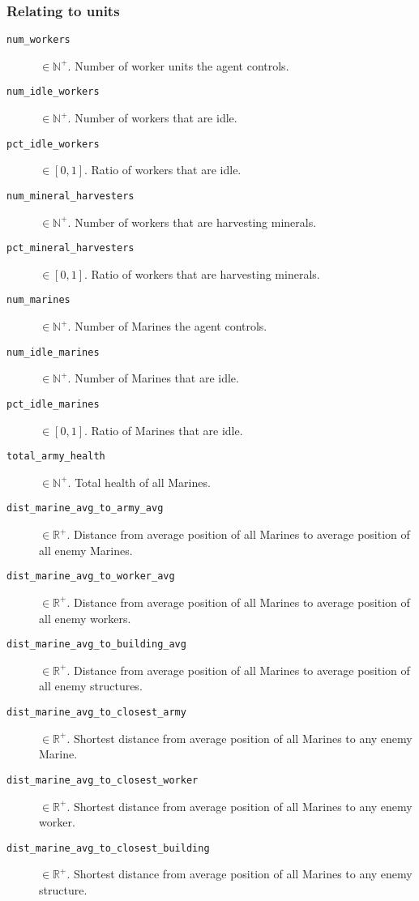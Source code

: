 \subsubsection*{Relating to units}
\begin{description}
    \item[\texttt{num\_workers}] $\in \mathbb{N}^+$. Number of worker units the agent controls.
    \item[\texttt{num\_idle\_workers}] $\in \mathbb{N}^+$. Number of workers that are idle.
    \item[\texttt{pct\_idle\_workers}] $\in [0,1]$. Ratio of workers that are idle.
    \item[\texttt{num\_mineral\_harvesters}] $\in \mathbb{N}^+$. Number of workers that are harvesting minerals.
    \item[\texttt{pct\_mineral\_harvesters}] $\in [0,1]$. Ratio of workers that are harvesting minerals.
    \item[\texttt{num\_marines}] $\in \mathbb{N}^+$. Number of Marines the agent controls.
    \item[\texttt{num\_idle\_marines}] $\in \mathbb{N}^+$. Number of Marines that are idle.
    \item[\texttt{pct\_idle\_marines}] $\in [0,1]$. Ratio of Marines that are idle.
    \item[\texttt{total\_army\_health}] $\in \mathbb{N}^+$. Total health of all Marines.
    \item[\texttt{dist\_marine\_avg\_to\_army\_avg}] $\in \mathbb{R}^+$. Distance from average position of all Marines to average position of all enemy Marines.
    \item[\texttt{dist\_marine\_avg\_to\_worker\_avg}] $\in \mathbb{R}^+$. Distance from average position of all Marines to average position of all enemy workers.
    \item[\texttt{dist\_marine\_avg\_to\_building\_avg}] $\in \mathbb{R}^+$. Distance from average position of all Marines to average position of all enemy structures.
    \item[\texttt{dist\_marine\_avg\_to\_closest\_army}] $\in \mathbb{R}^+$. Shortest distance from average position of all Marines to any enemy Marine.
    \item[\texttt{dist\_marine\_avg\_to\_closest\_worker}] $\in \mathbb{R}^+$. Shortest distance from average position of all Marines to any enemy worker.
    \item[\texttt{dist\_marine\_avg\_to\_closest\_building}] $\in \mathbb{R}^+$. Shortest distance from average position of all Marines to any enemy structure.
\end{description}

